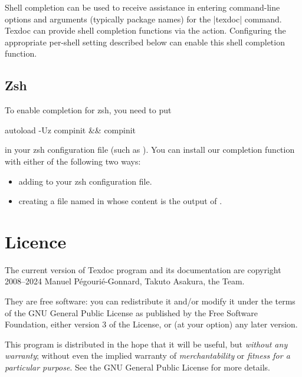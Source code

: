 \documentclass{texdoc-doc}
\begin{document}
Shell completion can be used to receive assistance in entering command-line
options and arguments (typically package names) for the |texdoc| command.
Texdoc can provide shell completion functions via the 
action. Configuring the appropriate per-shell setting described below can
enable this shell completion function.


\subsection{Zsh}

To enable completion for zsh, you need to put
%
\begin{htcode}
autoload -Uz compinit && compinit
\end{htcode}
%
in your zsh configuration file (such as ). You can install
our completion function with either of the following two ways:
%
\begin{itemize}
\item adding  to your
  zsh configuration file.

\item creating a file named  in  whose content is
  the output of .
\end{itemize}

\section{Licence}
\label{sec:licence}

The current version of Texdoc program and its documentation are copyright
2008--2024 Manuel Pégourié-Gonnard, Takuto Asakura, the {\TL} Team.

They are free software: you can redistribute it and/or modify it under the
terms of the GNU General Public License as published by the Free Software
Foundation, either version 3 of the License, or (at your option) any later
version.

This program is distributed in the hope that it will be useful, but
\emph{without any warranty}; without even the implied warranty of
\emph{merchantability} or \emph{fitness for a particular purpose}. See the
GNU General Public License for more details.
\end{document}
